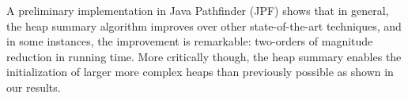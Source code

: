 
A preliminary implementation in Java Pathfinder (JPF) shows that in
general, the heap summary algorithm improves over other
state-of-the-art techniques, and in some instances, the improvement is
remarkable: two-orders of magnitude reduction in running time. More
critically though, the heap summary enables the initialization of
larger more complex heaps than previously possible as shown in our
results.



\begin{comment}
We implement the summary heap algorithm as an extension to \emph{Java
  PathFinder} (JPF) and compare it to GSE with lazy initialization in
\emph{Symbolic Pathfinder (SPF)} and an implementation of lazier\#
initialization in SPF.  The comparison shows on some examples up to a two-order of magnitude
reduction in the total time taken to explore the same state space
defined by the bound on the longest heap reference chain.  For these
examples, we show that where other GSE approaches are unable to
complete exploration within the provided time bound, the summary heap
finishes exploration in a few seconds.
\end{comment}





